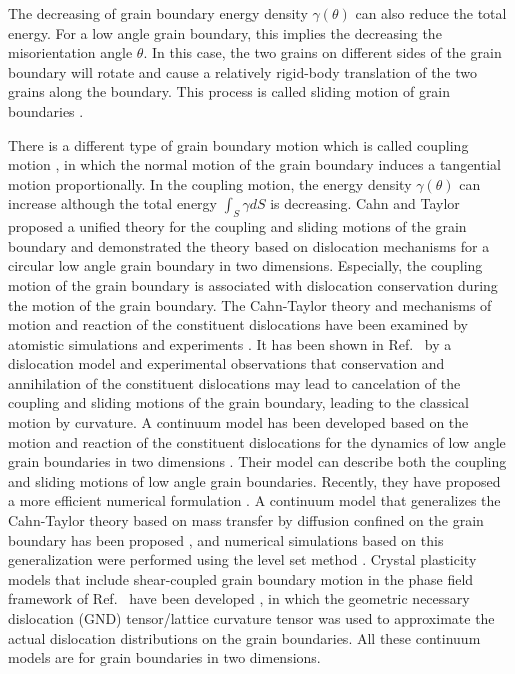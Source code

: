 The decreasing of grain boundary energy density $\gamma(\theta)$ can also reduce the total energy. For a low angle grain boundary,
this implies the decreasing the misorientation angle $\theta$.
In this case, the two grains on different sides of the grain boundary will rotate and cause a relatively rigid-body translation of the two grains along the boundary. This process is called sliding motion of grain boundaries \cite{li1962possibility,shewmon1966energy,harris1998grain,Kobayashi2000,upmanyu2006simultaneous,esedoglu2016grain,epshteyn2019motion}.

There is a different type of grain boundary motion which is called coupling motion \cite{li1953stress,srinivasan2002challenging,cahn2004unified}, in which
 the normal motion of the grain boundary induces a tangential motion proportionally. In the coupling motion, the energy density $\gamma(\theta)$ can increase although the total energy $\int_S\gamma dS $  is decreasing. Cahn and Taylor \cite{cahn2004unified} proposed a unified theory for the coupling and sliding motions of the grain boundary and demonstrated the theory based on dislocation mechanisms for a circular low angle grain boundary in two dimensions. Especially, the coupling motion of the grain boundary is associated with dislocation conservation during the motion of the grain boundary.  The  Cahn-Taylor theory and mechanisms of motion and reaction of the constituent dislocations have been examined by atomistic simulations and experiments \cite{srinivasan2002challenging,cahn2006coupling,molodov2007low,Molodov2009,trautt2012grain,wu2012phase,mcreynolds2016grain,yamanaka2017phase,salvalaglio2018defects}. It has been shown in Ref.~\cite{Rath2007} by a dislocation model and experimental observations that conservation and annihilation of the constituent dislocations may lead to cancelation of the coupling and sliding motions of the grain boundary, leading to the classical motion by curvature.    A continuum model  has been developed based on the motion and reaction of the constituent dislocations  for the dynamics of low angle grain boundaries in two dimensions \cite{zhang2018motion}. Their model can describe both the coupling  and sliding motions of low angle grain boundaries. Recently, they have proposed a more efficient numerical formulation \cite{zhang2019new}.
A continuum model that generalizes the Cahn-Taylor theory based on mass transfer by diffusion confined on the grain boundary has been proposed \cite{Taylor2007}, and numerical simulations based on this generalization were performed using the level set method \cite{Gupta2014}. Crystal plasticity models that include shear-coupled grain boundary motion in the phase field framework of Ref.~\cite{Kobayashi2000} have been developed \cite{AdmalIJP2018,AskJMPS2018}, in which the geometric necessary dislocation (GND) tensor/lattice curvature tensor was used to approximate the actual dislocation distributions on the grain boundaries. All these continuum models are for grain boundaries in two dimensions.

